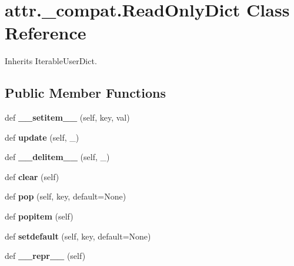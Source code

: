 \hypertarget{classattr_1_1__compat_1_1_read_only_dict}{}\section{attr.\+\_\+compat.\+Read\+Only\+Dict Class Reference}
\label{classattr_1_1__compat_1_1_read_only_dict}


Inherits Iterable\+User\+Dict.

\subsection*{Public Member Functions}
\begin{DoxyCompactItemize}
\item 
\mbox{\label{classattr_1_1__compat_1_1_read_only_dict_a43cdb1810aad0f42670f28e486656f6f}} 
def {\bfseries \+\_\+\+\_\+setitem\+\_\+\+\_\+} (self, key, val)
\item 
\mbox{\label{classattr_1_1__compat_1_1_read_only_dict_ade86ecb1aa56cadb062e4bf17a7bc30a}} 
def {\bfseries update} (self, \+\_\+)
\item 
\mbox{\label{classattr_1_1__compat_1_1_read_only_dict_a985e6acb09a2adfb28cf45c8862fb84c}} 
def {\bfseries \+\_\+\+\_\+delitem\+\_\+\+\_\+} (self, \+\_\+)
\item 
\mbox{\label{classattr_1_1__compat_1_1_read_only_dict_add4bb4be82c202db88c114d38a4c0aab}} 
def {\bfseries clear} (self)
\item 
\mbox{\label{classattr_1_1__compat_1_1_read_only_dict_a9214980e29a54c600fc84ab74dbd9afc}} 
def {\bfseries pop} (self, key, default=None)
\item 
\mbox{\label{classattr_1_1__compat_1_1_read_only_dict_a59133df1ba7008afd56329517561c520}} 
def {\bfseries popitem} (self)
\item 
\mbox{\label{classattr_1_1__compat_1_1_read_only_dict_ad0007f854a64e421b31d24601d77b9af}} 
def {\bfseries setdefault} (self, key, default=None)
\item 
\mbox{\label{classattr_1_1__compat_1_1_read_only_dict_ab41253138ebc0b04570a7aaa94ccff40}} 
def {\bfseries \+\_\+\+\_\+repr\+\_\+\+\_\+} (self)
\end{DoxyCompactItemize}


